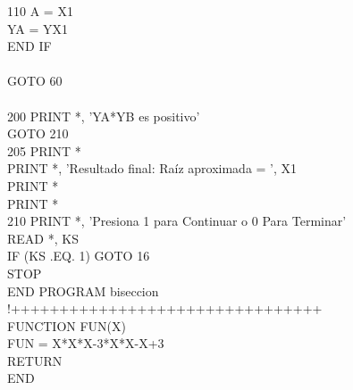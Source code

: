 \documentclass[12pt]{article}
\begin{document}
{\begin{tabbing}
110	\> \> A = X1 \\
	\> \> YA = YX1 \\
	\> END IF \\
\\
	\> GOTO 60 \\
\\
200 \> PRINT *, 'YA*YB es positivo' \\
	\> GOTO 210 \\
205	\> PRINT * \\
	\> PRINT *, 'Resultado final:	Raíz aproximada = ', X1 \\
	\> PRINT * \\
	\> PRINT * \\
210	\> PRINT *, 'Presiona 1 para Continuar o 0 Para Terminar' \\
	\> READ *, KS \\
	\> IF (KS .EQ. 1) GOTO 16 \\
	\> STOP \\
END PROGRAM biseccion \\
!++++++++++++++++++++++++++++++++ \\
FUNCTION FUN(X) \\
\>	FUN = X*X*X-3*X*X-X+3 \\
\>	RETURN \\
END \\
\end{tabbing}
}
\end{document}
